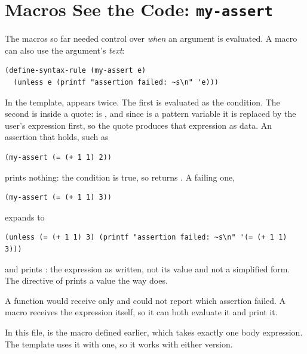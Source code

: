 \section{Macros See the Code: \texttt{my-assert}}
\label{sec:myassert}

The macros so far needed control over \emph{when} an argument is evaluated. A macro can also use the argument's \emph{text}:
\begin{lstlisting}
(define-syntax-rule (my-assert e)
  (unless e (printf "assertion failed: ~s\n" 'e)))
\end{lstlisting}
In the template,  appears twice. The first  is evaluated as the condition. The second is inside a quote:  is , and since  is a pattern variable it is replaced by the user's expression first, so the quote produces that expression as data. An assertion that holds, such as
\begin{lstlisting}
(my-assert (= (+ 1 1) 2))
\end{lstlisting}
prints nothing: the condition is true, so  returns . A failing one,
\begin{lstlisting}
(my-assert (= (+ 1 1) 3))
\end{lstlisting}
expands to
\begin{lstlisting}
(unless (= (+ 1 1) 3) (printf "assertion failed: ~s\n" '(= (+ 1 1) 3)))
\end{lstlisting}
and prints : the expression as written, not its value  and not a simplified form. The  directive of  prints a value the way  does.

\begin{keypoint}
A function  would receive only  and could not report which assertion failed. A macro receives the expression itself, so it can both evaluate it and print it.
\end{keypoint}

\begin{remark}
In this file,  is the macro defined earlier, which takes exactly one body expression. The template uses it with one, so it works with either version.
\end{remark}
